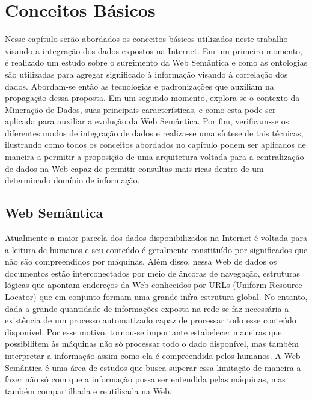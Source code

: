 \chapter{Conceitos Básicos}
\label{cap:aspectos-basicos}

Nesse capítulo serão abordados os conceitos básicos utilizados neste trabalho visando a integração dos dados expostos na Internet. Em um primeiro momento, é realizado um estudo sobre o surgimento da Web Semântica e como as ontologias são utilizadas para agregar significado à informação visando à correlação dos dados. Abordam-se então as tecnologias e padronizações que auxiliam na propagação dessa proposta. Em um segundo momento, explora-se o contexto da Mineração de Dados, suas principais características, e como esta pode ser aplicada para auxiliar a evolução da Web Semântica. Por fim, verificam-se os diferentes modos de integração de dados e realiza-se uma síntese de tais técnicas, ilustrando como todos os conceitos abordados no capítulo podem ser aplicados de maneira a permitir a proposição de uma arquitetura voltada para a centralização de dados na Web capaz de permitir consultas mais ricas dentro de um determinado domínio de informação.

\section{Web Semântica}
\label{sec:Websemantica}

Atualmente a maior parcela dos dados disponibilizados na Internet é voltada para a leitura de humanos \citep{Berners-lee2001} e seu conteúdo é geralmente constituído por significados que não são compreendidos por máquinas. Além disso, nessa Web de dados os documentos estão interconectados por meio de âncoras de navegação, estruturas lógicas que apontam endereços da Web conhecidos por URLs (Uniform Resource Locator) que em conjunto formam uma grande infra-estrutura global. No entanto, dada a grande quantidade de informações exposta na rede se faz necessária a existência de um processo automatizado capaz de processar todo esse conteúdo disponível. Por esse motivo, tornou-se importante estabelecer maneiras que possibilitem às máquinas não só processar todo o dado disponível, mas também interpretar a informação assim como ela é compreendida pelos humanos. A Web Semântica é uma área de estudos que busca superar essa limitação de maneira a fazer não só com que a informação possa ser entendida pelas máquinas, mas também compartilhada e reutilizada na Web.


